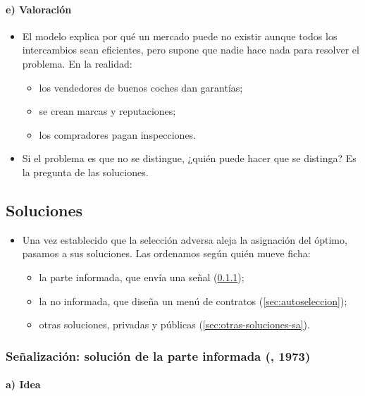 \documentclass[11pt]{article}
\begin{document}
\paragraph{e) Valoración}

\begin{itemize}
\item El modelo explica por qué un mercado puede no existir aunque todos los intercambios sean eficientes, pero supone que nadie hace nada para resolver el problema. En la realidad:
  \begin{itemize}
  \item los vendedores de buenos coches dan garantías;
  \item se crean marcas y reputaciones;
  \item los compradores pagan inspecciones.
  \end{itemize}
\item Si el problema es que no se distingue, ¿quién puede hacer que se distinga? Es la pregunta de las soluciones.
\end{itemize}

\subsection{Soluciones}\label{sec:soluciones-sa}

\begin{itemize}
\item Una vez establecido que la selección adversa aleja la asignación del óptimo, pasamos a sus soluciones. Las ordenamos según quién mueve ficha:
  \begin{itemize}
  \item la parte informada, que envía una señal (\ref{sec:senalizacion});
  \item la no informada, que diseña un menú de contratos (\ref{sec:autoseleccion});
  \item otras soluciones, privadas y públicas (\ref{sec:otras-soluciones-sa}).
  \end{itemize}
\end{itemize}

\subsubsection{Señalización: solución de la parte informada (, 1973)}\label{sec:senalizacion}

\paragraph{a) Idea}
\end{document}
